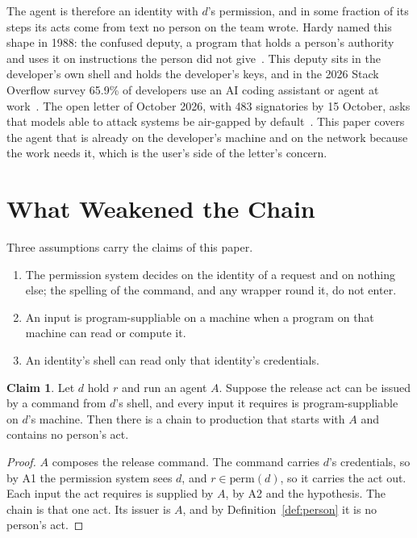 \documentclass[11pt]{article}
\theoremstyle{definition}
\newtheorem{claim}{Claim}
\begin{document}
The agent is therefore an identity with $d$'s permission, and in some fraction of its steps its acts come from text no person on the team wrote. Hardy named this shape in 1988: the confused deputy, a program that holds a person's authority and uses it on instructions the person did not give~\cite{Hardy}. This deputy sits in the developer's own shell and holds the developer's keys, and in the 2026 Stack Overflow survey 65.9\% of developers use an AI coding assistant or agent at work~\cite{SO2026}. The open letter of October 2026, with 483 signatories by 15 October, asks that models able to attack systems be air-gapped by default~\cite{Letter}. This paper covers the agent that is already on the developer's machine and on the network because the work needs it, which is the user's side of the letter's concern.

\section{What Weakened the Chain}
\label{sec:weak}

Three assumptions carry the claims of this paper.

\begin{enumerate}[label=A\arabic*.]
\item The permission system decides on the identity of a request and on nothing else; the spelling of the command, and any wrapper round it, do not enter.
\item An input is program-suppliable on a machine when a program on that machine can read or compute it.
\item An identity's shell can read only that identity's credentials.
\end{enumerate}

\begin{claim}
\label{cl:break}
Let $d$ hold $r$ and run an agent $A$. Suppose the release act can be issued by a command from $d$'s shell, and every input it requires is program-suppliable on $d$'s machine. Then there is a chain to production that starts with $A$ and contains no person's act.
\end{claim}

\begin{proof}
$A$ composes the release command. The command carries $d$'s credentials, so by A1 the permission system sees $d$, and $r \in \mathrm{perm}(d)$, so it carries the act out. Each input the act requires is supplied by $A$, by A2 and the hypothesis. The chain is that one act. Its issuer is $A$, and by Definition~\ref{def:person} it is no person's act.
\end{proof}
\end{document}
